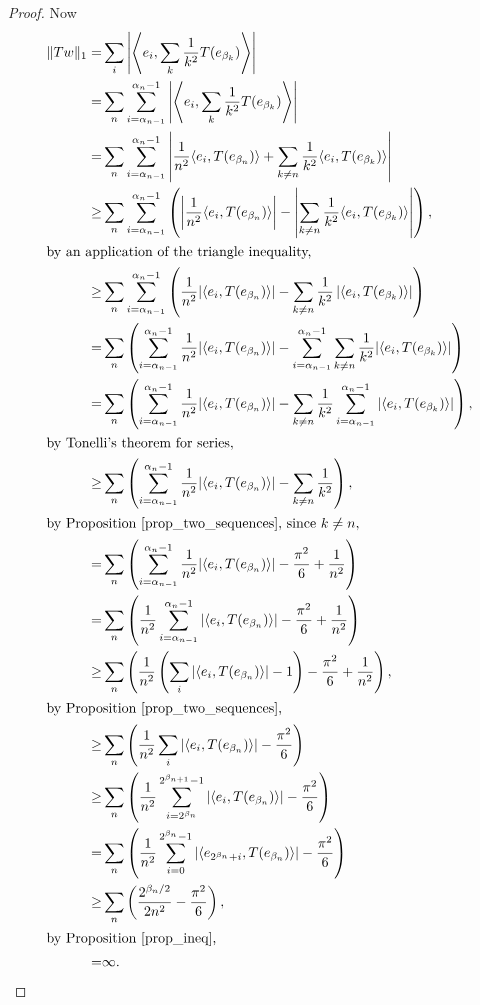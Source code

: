 \documentclass[12pt]{article}
\begin{document}
\begin{proof}
	Now 
	\begin{align*}
		\|Tw\|_1
		=& \sum_i\left|\left\langle e_i,\sum_k\frac{1}{k^2}T(e_{\beta_k})\right\rangle \right| \\
		=& \sum_n \sum_{i=\alpha_{n-1}}^{\alpha_n-1}\left|\left\langle e_i,\sum_k\frac{1}{k^2}T(e_{\beta_k})\right\rangle \right| \\
		=& \sum_n \sum_{i=\alpha_{n-1}}^{\alpha_n-1} \left|\frac{1}{n^2}\langle e_i,T(e_{\beta_n})\rangle + \sum_{k\neq n}\frac{1}{k^2}\langle e_i,T(e_{\beta_k})\rangle \right| \\	
		\geq& \sum_n \sum_{i=\alpha_{n-1}}^{\alpha_n-1} \left(\left|\frac{1}{n^2}\langle e_i,T(e_{\beta_n})\rangle \right|-\left|\sum_{k\neq n}\frac{1}{k^2}\langle e_i,T(e_{\beta_k})\rangle \right|\right), \\
		\intertext{by an application of the triangle inequality,}
		\geq& \sum_n \sum_{i=\alpha_{n-1}}^{\alpha_n-1} \left(\frac{1}{n^2}|\langle e_i,T(e_{\beta_n})\rangle |-\sum_{k\neq n}\frac{1}{k^2}\left|\langle e_i,T(e_{\beta_k})\rangle \right|\right) \\
	=& \sum_n\left(\sum_{i=\alpha_{n-1}}^{\alpha_n-1}\frac{1}{n^2}|\langle e_i,T(e_{\beta_n})\rangle | - \sum_{i=\alpha_{n-1}}^{\alpha_n-1}\sum_{k\neq n}\frac{1}{k^2}|\langle e_i,T(e_{\beta_k})\rangle |\right) \\
		=& \sum_n\left(\sum_{i=\alpha_{n-1}}^{\alpha_n-1}\frac{1}{n^2}|\langle e_i,T(e_{\beta_n})\rangle | - \sum_{k\neq n}\frac{1}{k^2}\sum_{i=\alpha_{n-1}}^{\alpha_n-1}|\langle e_i,T(e_{\beta_k})\rangle |\right), \\
		\intertext{by Tonelli's theorem for series,}
		\geq& \sum_n\left(\sum_{i=\alpha_{n-1}}^{\alpha_n-1}\frac{1}{n^2}|\langle e_i,T(e_{\beta_n})\rangle | - \sum_{k\neq n}\frac{1}{k^2}\right), \\
		\intertext{by Proposition \ref{prop_two_sequences}, since $k\neq n$,}
		=& \sum_n\left(\sum_{i=\alpha_{n-1}}^{\alpha_n-1}\frac{1}{n^2}|\langle e_i,T(e_{\beta_n})\rangle | - \frac{\pi^2}{6} + \frac{1}{n^2}\right) \\
		=& \sum_n\left(\frac{1}{n^2}\sum_{i=\alpha_{n-1}}^{\alpha_n-1}|\langle e_i,T(e_{\beta_n})\rangle | - \frac{\pi^2}{6} + \frac{1}{n^2}\right) \\
		\geq& \sum_n\left(\frac{1}{n^2}\left(\sum_{i}|\langle e_i,T(e_{\beta_n})\rangle | - 1\right) - \frac{\pi^2}{6} + \frac{1}{n^2}\right), \\
		\intertext{by Proposition \ref{prop_two_sequences},}
		\geq& \sum_n\left(\frac{1}{n^2}\sum_{i}|\langle e_i,T(e_{\beta_n})\rangle | - \frac{\pi^2}{6}\right) \\
		\geq& \sum_n\left(\frac{1}{n^2}\sum_{i=2^{\beta_n}}^{2^{\beta_{n+1}}-1}|\langle e_i,T(e_{\beta_n})\rangle | - \frac{\pi^2}{6}\right) \\
		=& \sum_n\left(\frac{1}{n^2}\sum_{i=0}^{2^{\beta_{n}}-1}|\langle e_{2^{\beta_n}+i},T(e_{\beta_n})\rangle | - \frac{\pi^2}{6}\right) \\
		\geq& \sum_n\left(\frac{2^{\beta_n/2}}{2n^2}-\frac{\pi^2}{6}\right), \\
		\intertext{by Proposition \ref{prop_ineq},}
		=& \infty.
	\end{align*}


\end{proof}
\end{document}
